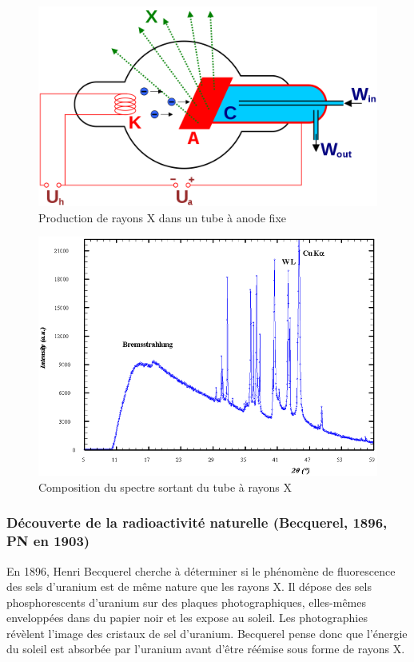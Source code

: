 \begin{figure}[ht]
    \centering
    \includegraphics[scale=0.25]{Images1/rayonsxtube.png}
    \caption{Production de rayons X dans un tube à anode fixe}
    \label{fig:tube_rayon_x}
\end{figure}

\begin{figure}[ht]
    \centering
    \includegraphics[scale=0.30]{Images1/rayonnement.PNG}
    \caption{Composition du spectre sortant du tube à rayons X}
    \label{fig:spectre_rayon_x}
\end{figure}

\subsubsection{Découverte de la radioactivité naturelle (Becquerel, 1896, PN en 1903)}

En 1896, Henri Becquerel cherche à déterminer si le phénomène de fluorescence des sels d'uranium est de même nature que les rayons X. Il dépose des sels phosphorescents d'uranium sur des plaques photographiques, elles-mêmes enveloppées dans du papier noir et les expose au soleil. Les photographies révèlent l'image des cristaux de sel d'uranium. Becquerel pense donc que l'énergie du soleil est absorbée par l'uranium avant d'être réémise sous forme de rayons X. 

